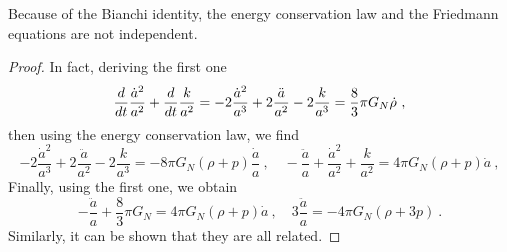     \noindent Because of the Bianchi identity, the energy conservation law and the Friedmann equations are not independent.
    \begin{proof}
        In fact, deriving the first one
        \begin{equation*}
            \frac{d}{dt} \frac{\dot a^2}{a^2} + \frac{d}{dt} \frac{k}{a^2} = - 2 \frac{\dot a^2 }{a^3} + 2 \frac{\ddot a}{a^2} - 2 \frac{k}{a^3} = \frac{8}{3} \pi G_N \dot \rho ~,
        \end{equation*}
        then using the energy conservation law, we find 
        \begin{equation*}
            - 2 \frac{\dot a^2 }{a^3} + 2 \frac{\ddot a}{a^2} - 2 \frac{k}{a^3} = - 8 \pi G_N (\rho + p) \frac{\dot a}{a}  ~, \quad - \frac{\ddot a}{a} + \frac{\dot a^2 }{a^2}  + \frac{k}{a^2} = 4 \pi G_N (\rho + p) \dot a  ~, 
        \end{equation*}
        Finally, using the first one, we obtain 
        \begin{equation*}
            - \frac{\ddot a}{a} + \frac{8}{3} \pi G_N = 4 \pi G_N (\rho + p) \dot a  ~, \quad 3 \frac{\ddot a}{a} = - 4 \pi G_N (\rho + 3 p) ~.
        \end{equation*}
        Similarly, it can be shown that they are all related.
    \end{proof}

